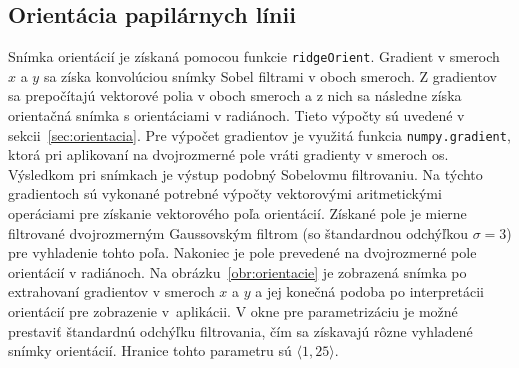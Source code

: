   \subsection{Orientácia papilárnych línii}
  Snímka orientácií je získaná pomocou funkcie \texttt{ridgeOrient}. Gradient v smeroch $x$ a $y$ sa získa konvolúciou snímky Sobel filtrami v oboch smeroch.
  Z gradientov sa prepočítajú vektorové polia v oboch smeroch a z nich sa následne získa orientačná snímka s orientáciami v radiánoch. Tieto výpočty sú
  uvedené v sekcii~{\ref{sec:orientacia}}. Pre výpočet gradientov je využitá funkcia \texttt{numpy.gradient}, ktorá pri aplikovaní na dvojrozmerné pole
  vráti gradienty v smeroch os. Výsledkom pri snímkach je výstup podobný Sobelovmu filtrovaniu. Na týchto gradientoch sú vykonané potrebné výpočty vektorovými
  aritmetickými operáciami pre získanie vektorového poľa orientácií. Získané pole je mierne filtrované dvojrozmerným Gaussovským filtrom (so štandardnou
  odchýľkou $\sigma = 3$) pre vyhladenie tohto poľa. Nakoniec je pole prevedené na dvojrozmerné pole orientácií v radiánoch.
  Na obrázku~{\ref{obr:orientacie}} je zobrazená snímka po extrahovaní gradientov v smeroch $x$ a $y$ a jej konečná podoba po interpretácii orientácií pre
  zobrazenie v~aplikácii. V okne pre parametrizáciu je možné prestaviť štandardnú odchýľku filtrovania, čím sa získavajú rôzne vyhladené snímky orientácií.
  Hranice tohto parametru sú $\langle{}1,25\rangle{}$.

